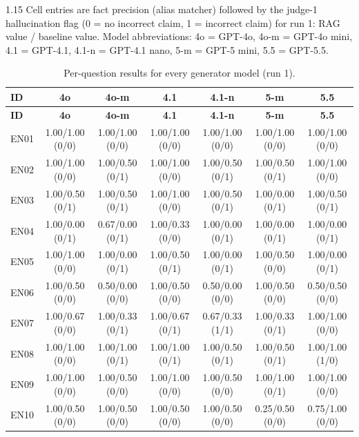 \begin{spacing}{1.15}
\scriptsize
\setlength{\tabcolsep}{3pt}
Cell entries are fact precision (alias matcher) followed by the judge-1 hallucination flag (0 = no incorrect claim, 1 = incorrect claim) for run 1: RAG value / baseline value. Model abbreviations: 4o = GPT-4o, 4o-m = GPT-4o mini, 4.1 = GPT-4.1, 4.1-n = GPT-4.1 nano, 5-m = GPT-5 mini, 5.5 = GPT-5.5.
\par\vspace{4pt}
\begin{longtable}{@{}lcccccc@{}}
\caption{Per-question results for every generator model (run 1).}\label{tab:per-question} \\
\toprule
\textbf{ID} & \textbf{4o} & \textbf{4o-m} & \textbf{4.1} & \textbf{4.1-n} & \textbf{5-m} & \textbf{5.5} \\
\midrule
\endfirsthead
\toprule
\textbf{ID} & \textbf{4o} & \textbf{4o-m} & \textbf{4.1} & \textbf{4.1-n} & \textbf{5-m} & \textbf{5.5} \\
\midrule
\endhead
\bottomrule
\endfoot
EN01 & 1.00/1.00 (0/0) & 1.00/1.00 (0/0) & 1.00/1.00 (0/0) & 1.00/1.00 (0/0) & 1.00/1.00 (0/0) & 1.00/1.00 (0/0) \\
EN02 & 1.00/1.00 (0/0) & 1.00/0.50 (0/1) & 1.00/1.00 (0/0) & 1.00/0.50 (0/1) & 1.00/0.50 (0/1) & 1.00/1.00 (0/0) \\
EN03 & 1.00/0.50 (0/1) & 1.00/0.50 (0/1) & 1.00/1.00 (0/0) & 1.00/0.50 (0/1) & 1.00/0.00 (0/1) & 1.00/0.50 (0/1) \\
EN04 & 1.00/0.00 (0/1) & 0.67/0.00 (0/1) & 1.00/0.33 (0/0) & 1.00/0.00 (0/1) & 1.00/0.00 (0/1) & 1.00/0.00 (0/1) \\
EN05 & 1.00/1.00 (0/0) & 1.00/0.00 (0/1) & 1.00/0.50 (0/1) & 1.00/0.00 (0/1) & 1.00/0.50 (0/0) & 1.00/0.00 (0/1) \\
EN06 & 1.00/0.50 (0/0) & 0.50/0.00 (0/0) & 1.00/0.50 (0/0) & 0.50/0.00 (0/0) & 1.00/0.50 (0/0) & 0.50/0.50 (0/0) \\
EN07 & 1.00/0.67 (0/0) & 1.00/0.33 (0/1) & 1.00/0.67 (0/1) & 0.67/0.33 (1/1) & 1.00/0.33 (0/1) & 1.00/1.00 (0/0) \\
EN08 & 1.00/1.00 (0/0) & 1.00/1.00 (0/1) & 1.00/1.00 (0/1) & 1.00/0.50 (0/1) & 1.00/0.50 (0/1) & 1.00/1.00 (1/0) \\
EN09 & 1.00/1.00 (0/0) & 1.00/0.50 (0/0) & 1.00/1.00 (0/0) & 1.00/0.50 (0/0) & 1.00/1.00 (0/1) & 1.00/1.00 (0/0) \\
EN10 & 1.00/0.50 (0/0) & 1.00/0.50 (0/0) & 1.00/0.50 (0/0) & 1.00/0.50 (0/0) & 0.25/0.50 (0/0) & 0.75/1.00 (0/0) \\

\end{longtable}
\end{spacing}
